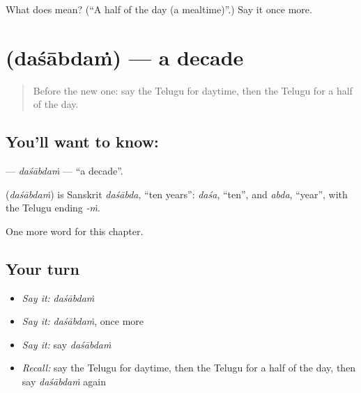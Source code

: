 \begin{tcolorbox}[breakable,colback=teal!4,colframe=teal!35!black,title={Before you move on}]
What does  mean? (\textquotedblleft{}A half of the day (a mealtime)\textquotedblright{}.) Say it once more.
\end{tcolorbox}
\section[\texorpdfstring{\te{దశాబ్దం} (daśābdaṁ)}{దశాబ్దం (daśābdaṁ)}]{ (daśābdaṁ) — a decade}

\label{lesson:TE-C290-dasabdam}



\begin{quote}
Before the new one: say the Telugu for daytime, then the Telugu for a half of the day.
\end{quote}

\subsection*{You'll want to know: }
\textbf{} — \emph{daśābdaṁ} — \textquotedblleft{}a decade\textquotedblright{}.

\begin{cousinweb}
\textbf{} (\emph{daśābdaṁ}) is Sanskrit \emph{daśābda}, \textquotedblleft{}ten years\textquotedblright{}: \emph{daśa}, \textquotedblleft{}ten\textquotedblright{}, and \emph{abda}, \textquotedblleft{}year\textquotedblright{}, with the Telugu ending \emph{-ṁ}.
\end{cousinweb}

\begin{grammarlens}[title={What you've built}]
One more word for this chapter.
\end{grammarlens}

\subsection*{Your turn}
\begin{itemize}
\raggedright
  \item \emph{Say it:} \emph{daśābdaṁ}
  \item \emph{Say it:} \emph{daśābdaṁ}, once more
  \item \emph{Say it:} say \emph{daśābdaṁ}
  \item \emph{Recall:} say the Telugu for daytime, then the Telugu for a half of the day, then say \emph{daśābdaṁ} again
\end{itemize}

